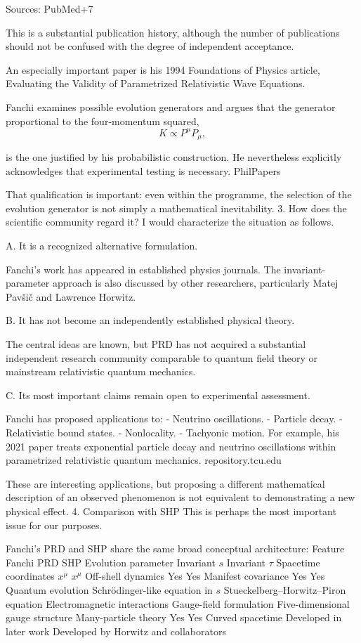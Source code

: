Sources: 
PubMed+7


This is a substantial publication history, although the number of publications should not be confused with the degree of independent acceptance.

An especially important paper is his 1994 Foundations of Physics article, Evaluating the Validity of Parametrized Relativistic Wave Equations.

Fanchi examines possible evolution generators and argues that the generator proportional to the four-momentum squared,
\[
K\propto P^\mu P_\mu,
\]

is the one justified by his probabilistic construction. He nevertheless explicitly acknowledges that experimental testing is necessary. 
PhilPapers


That qualification is important: even within the programme, the selection of the evolution generator is not simply a mathematical inevitability.
3. How does the scientific community regard it?
I would characterize the situation as follows.

A. It is a recognized alternative formulation.

Fanchi's work has appeared in established physics journals. The invariant-parameter approach is also discussed by other researchers, particularly Matej Pavšič and Lawrence Horwitz.

B. It has not become an independently established physical theory.

The central ideas are known, but PRD has not acquired a substantial independent research community comparable to quantum field theory or mainstream relativistic quantum mechanics.

C. Its most important claims remain open to experimental assessment.

Fanchi has proposed applications to:
- Neutrino oscillations.
- Particle decay.
- Relativistic bound states.
- Nonlocality.
- Tachyonic motion.
For example, his 2021 paper treats exponential particle decay and neutrino oscillations within parametrized relativistic quantum mechanics. 
repository.tcu.edu


These are interesting applications, but proposing a different mathematical description of an observed phenomenon is not equivalent to demonstrating a new physical effect.
4. Comparison with SHP
This is perhaps the most important issue for our purposes.

Fanchi's PRD and SHP share the same broad conceptual architecture:
Feature	Fanchi PRD	SHP
Evolution parameter	Invariant \(s\)	Invariant \(\tau\)
Spacetime coordinates	\(x^\mu\)	\(x^\mu\)
Off-shell dynamics	Yes	Yes
Manifest covariance	Yes	Yes
Quantum evolution	Schrödinger-like equation in \(s\)	Stueckelberg–Horwitz–Piron equation
Electromagnetic interactions	Gauge-field formulation	Five-dimensional gauge structure
Many-particle theory	Yes	Yes
Curved spacetime	Developed in later work	Developed by Horwitz and collaborators

